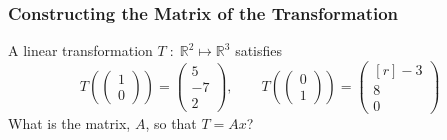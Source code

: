 \begin{frame}
\frametitle{Constructing the Matrix of the Transformation}
A linear transformation  $ T \;:\;  \mathbb R ^2 \mapsto \mathbb R ^{3} $  satisfies 
\begin{equation*}
T \left( \begin{pmatrix}
 1 \\ 0
\end{pmatrix}\right) = \begin{pmatrix}
5 \\ -7 \\ 2  
\end{pmatrix},
\qquad 
T \left( \begin{pmatrix*}
  0 \\ 1
 \end{pmatrix*} \right) = \begin{pmatrix*}[r]
-3 \\ 8 \\ 0  
\end{pmatrix*}
\end{equation*}
What is the matrix, $A$, so that $ T = Ax$? 

\end{frame}





